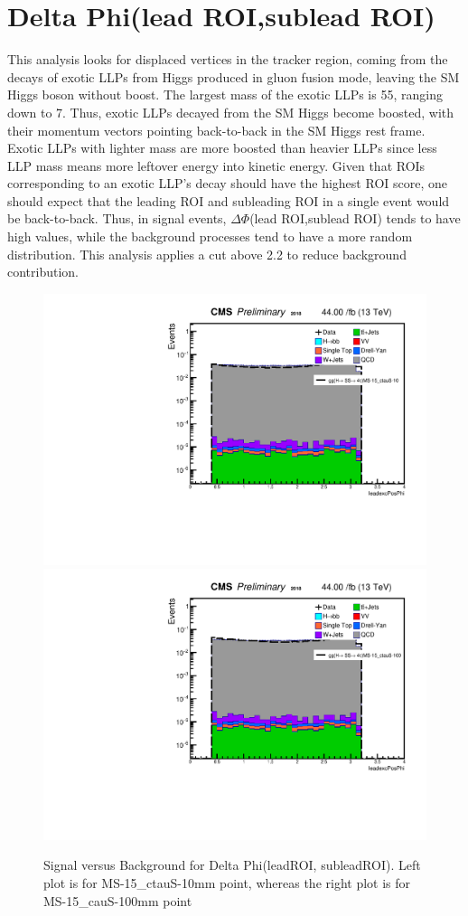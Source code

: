 \section{Delta Phi(lead ROI,sublead ROI)}\label{sec:DeltaPhi}
This analysis looks for displaced vertices in the tracker region, coming from the decays of exotic LLPs from Higgs produced in gluon fusion mode, leaving the SM Higgs boson without boost.
The largest mass of the exotic LLPs is 55\GeV, ranging down to 7\GeV.
Thus, exotic LLPs decayed from the SM Higgs become boosted, with their momentum vectors pointing back-to-back in the SM Higgs rest frame.
Exotic LLPs with lighter mass are more boosted than heavier LLPs since less LLP mass means more leftover energy into kinetic energy.
Given that ROIs corresponding to an exotic LLP's decay should have the highest ROI score, one should expect that the leading ROI and subleading ROI in a single event would be back-to-back.
Thus, in signal events, $\Delta\Phi$(lead ROI,sublead ROI) tends to have high values, while the background processes tend to have a more random distribution.
This analysis applies a cut above 2.2 to reduce background contribution.



 \begin{figure}[h!]
   \caption{Signal versus Background for Delta Phi(leadROI, subleadROI). Left plot is for MS-15\_ctauS-10mm point, whereas the right plot is for MS-15\_cauS-100mm point}
   \label{fig:leadexcPosPhi}
   \centering
   \includegraphics[width=0.40\linewidth]{figs/log_Oct6ANVars_MS-15_ctauS-10_leadexcPosPhi.pdf}
   \includegraphics[width=0.40\linewidth]{figs/log_Oct6ANVars_MS-15_ctauS-100_leadexcPosPhi.pdf}
 \end{figure}


